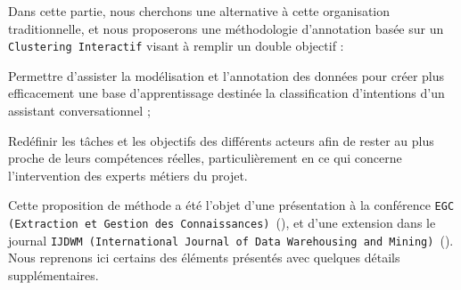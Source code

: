 	Dans cette partie, nous cherchons une alternative à cette organisation traditionnelle, et nous proposerons une méthodologie d'annotation basée sur un \texttt{Clustering Interactif} visant à remplir un double objectif :
	\begin{leftBarImportantRed}
		\begin{todolist}
			\item Permettre d'assister la modélisation et l'annotation des données pour créer plus efficacement une base d'apprentissage destinée la classification d'intentions d'un assistant conversationnel ;
			\item Redéfinir les tâches et les objectifs des différents acteurs afin de rester au plus proche de leurs compétences réelles, particulièrement en ce qui concerne l'intervention des experts métiers du projet.
		\end{todolist}
	\end{leftBarImportantRed}
	
	\begin{leftBarInformation}
		Cette proposition de méthode a été l'objet d'une présentation à la conférence \texttt{EGC (Extraction et Gestion des Connaissances)}~(\cite{schild-etal:2021:conception-iterative-semisupervisee}), et d'une extension dans le journal \texttt{IJDWM (International Journal of Data Warehousing and Mining)}~(\cite{schild-etal:2022:iterative-semisupervised-design}).
		Nous reprenons ici certains des éléments présentés avec quelques détails supplémentaires.
	\end{leftBarInformation}

	\minitoc


	


	


	